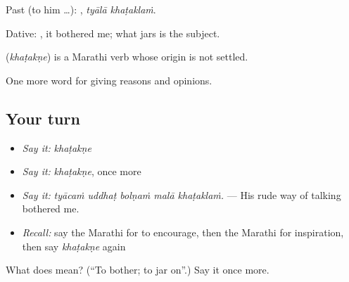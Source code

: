 Past (to him …):  , \emph{tyālā khaṭaklaṁ}.

Dative:  , it bothered me; what jars is the subject.

\begin{cousinweb}
\textbf{} (\emph{khaṭakṇe}) is a Marathi verb whose origin is not settled.
\end{cousinweb}

\begin{grammarlens}[title={What you've built}]
One more word for giving reasons and opinions.
\end{grammarlens}

\subsection*{Your turn}
\begin{itemize}
\raggedright
  \item \emph{Say it:} \emph{khaṭakṇe}
  \item \emph{Say it:} \emph{khaṭakṇe}, once more
  \item \emph{Say it:} \emph{tyācaṁ uddhaṭ bolṇaṁ malā khaṭaklaṁ.} — His rude way of talking bothered me.
  \item \emph{Recall:} say the Marathi for to encourage, then the Marathi for inspiration, then say \emph{khaṭakṇe} again
\end{itemize}

\begin{tcolorbox}[breakable,colback=teal!4,colframe=teal!35!black,title={Before you move on}]
What does  mean? (\textquotedblleft{}To bother; to jar on\textquotedblright{}.) Say it once more.
\end{tcolorbox}
